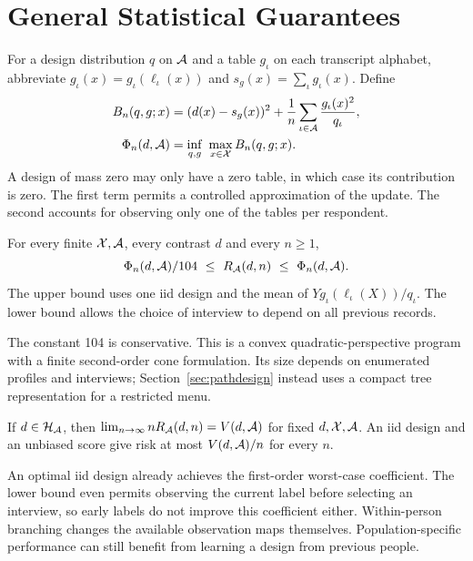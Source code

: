 \section{General Statistical Guarantees}\label{app:generalstatements}
For a design distribution $q$ on $\mathcal A$ and a table $g_\iota$ on each transcript alphabet, abbreviate $g_\iota(x)=g_\iota(\ell_\iota(x))$ and $s_g(x)=\sum_\iota g_\iota(x)$. Define
\begin{align}
 B_n(q,g;x)&=(d(x)-s_g(x))^2+
              \frac1n\sum_{\iota\in\mathcal A}\frac{g_\iota(x)^2}{q_\iota},\nonumber\\
 \Phi_n(d,\mathcal A)&=\inf_{q,g}\ \max_{x\in\mathcal X}B_n(q,g;x).
 \label{eq:program}
\end{align}
A design of mass zero may only have a zero table, in which case its contribution is zero. The first term permits a controlled approximation of the update. The second accounts for observing only one of the tables per respondent.

\begin{theorem}\label{thm:finite}
For every finite $\mathcal X,\mathcal A$, every contrast $d$ and every $n\ge1$,
\[
       \Phi_n(d,\A)/104 \ \le\ R_\A(d,n)\ \le\ \Phi_n(d,\A).
\]
The upper bound uses one iid design and the mean of $Yg_\iota(\ell_\iota(X))/q_\iota$. The lower bound allows the choice of interview to depend on all previous records.
\end{theorem}

The constant 104 is conservative. This is a convex quadratic-perspective program with a finite second-order cone formulation. Its size depends on enumerated profiles and interviews; Section~\ref{sec:pathdesign} instead uses a compact tree representation for a restricted menu.

\begin{samepage}
\begin{theorem}\label{thm:asym}
If $d\in\mathcal H_{\mathcal A}$, then $\lim_{n\to\infty}nR_\mathcal A(d,n)=V(d,\mathcal A)$ for fixed $d,\mathcal X,\mathcal A$. An iid design and an unbiased score give risk at most $V(d,\mathcal A)/n$ for every $n$.
\end{theorem}
\end{samepage}

An optimal iid design already achieves the first-order worst-case coefficient. The lower bound even permits observing the current label before selecting an interview, so early labels do not improve this coefficient either. Within-person branching changes the available observation maps themselves. Population-specific performance can still benefit from learning a design from previous people.

